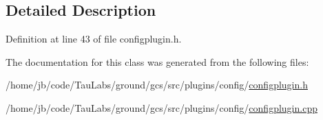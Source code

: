 \subsection{\-Detailed \-Description}


\-Definition at line 43 of file configplugin.\-h.



\-The documentation for this class was generated from the following files\-:\begin{DoxyCompactItemize}
\item 
/home/jb/code/\-Tau\-Labs/ground/gcs/src/plugins/config/\hyperlink{configplugin_8h}{configplugin.\-h}\item 
/home/jb/code/\-Tau\-Labs/ground/gcs/src/plugins/config/\hyperlink{configplugin_8cpp}{configplugin.\-cpp}\end{DoxyCompactItemize}
